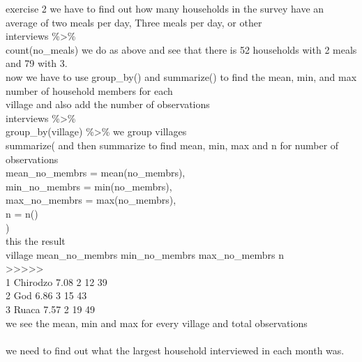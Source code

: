 \documentclass{article}
\begin{document}
  exercise 2 we have to find out how many households in the survey have an average of two meals per day, Three meals per day, or other\\
interviews \%\textgreater\%\\
  count(no\_meals)   we do as above and see that there is 52 households with 2 meals and 79 with 3. \\
  now we have to use group\_by() and summarize() to find the mean, min, and max number of household members for each\\ village and also add the number of observations\\
interviews \%\textgreater\%\\
  group\_by(village) \%\textgreater\%   we group villages \\
  summarize(   and then summarize to find mean, min, max and n for number of observations\\
    mean\_no\_membrs = mean(no\_membrs),\\
    min\_no\_membrs = min(no\_membrs),\\
    max\_no\_membrs = max(no\_membrs),\\
    n = n()\\
  )\\
  this the result\\
  village  mean\_no\_membrs min\_no\_membrs max\_no\_membrs     n\\
  \textlesschr\textgreater             \textlessdbl\textgreater         \textlessdbl\textgreater         \textlessdbl\textgreater \textlessint\textgreater\\
  1 Chirodzo           7.08             2            12    39\\
  2 God                6.86             3            15    43\\
  3 Ruaca              7.57             2            19    49\\
  we see the mean, min and max for every village and total observations \\\\

  we need to find out what the largest household interviewed in each month was. \\
\end{document}

